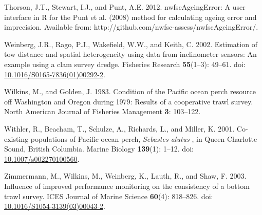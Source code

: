 \documentclass[12pt,]{article}
\begin{document}
\hypertarget{ref-thorson_nwfscageingerror:_2012}{}
Thorson, J.T., Stewart, I.J., and Punt, A.E. 2012. nwfscAgeingError: A
user interface in R for the Punt et al. (2008) method for calculating
ageing error and imprecision. Available from:
http://github.com/nwfsc-assess/nwfscAgeingError/.

\hypertarget{ref-weinberg_estimation_2002}{}
Weinberg, J.R., Rago, P.J., Wakefield, W.W., and Keith, C. 2002.
Estimation of tow distance and spatial heterogeneity using data from
inclinometer sensors: An example using a clam survey dredge. Fisheries
Research \textbf{55}(1--3): 49--61. doi:
\href{https://doi.org/10.1016/S0165-7836(01)00292-2}{10.1016/S0165-7836(01)00292-2}.

\hypertarget{ref-wilkins_condition_1983}{}
Wilkins, M., and Golden, J. 1983. Condition of the Pacific ocean perch
resource off Washington and Oregon during 1979: Results of a cooperative
trawl survey. North American Journal of Fisheries Management \textbf{3}:
103--122.

\hypertarget{ref-withler_co-existing_2001}{}
Withler, R., Beacham, T., Schulze, A., Richards, L., and Miller, K.
2001. Co-existing populations of Pacific ocean perch, \emph{Sebastes
alutus} , in Queen Charlotte Sound, British Columbia. Marine Biology
\textbf{139}(1): 1--12. doi:
\href{https://doi.org/10.1007/s002270100560}{10.1007/s002270100560}.

\hypertarget{ref-zimmermann_influence_2003}{}
Zimmermann, M., Wilkins, M., Weinberg, K., Lauth, R., and Shaw, F. 2003.
Influence of improved performance monitoring on the consistency of a
bottom trawl survey. ICES Journal of Marine Science \textbf{60}(4):
818--826. doi:
\href{https://doi.org/10.1016/S1054-3139(03)00043-2}{10.1016/S1054-3139(03)00043-2}.
\end{document}
